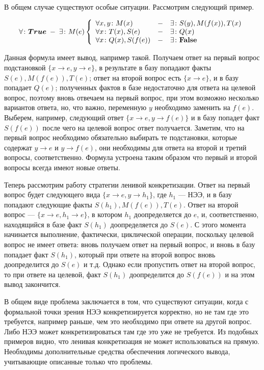 В общем случае существуют особые ситуации. Рассмотрим следующий пример.
\begin{example}[]\label{example:uhe1}
$$\forall\colon\boldsymbol{True} \; - \; \exists\colon M(e) \left\{
\begin{array}{lcl}
 \forall x,y\colon M(x) & - & \exists\colon S(y),M(f(x)),T(x) \\
 \forall x \colon T(x),S(e) & - & \exists\colon Q(x) \\
 \forall x \colon Q(x),S(f(e)) & - & \exists\colon\textbf{False}
\end{array}
\right.$$

Данная формула имеет вывод, например такой. Получаем ответ на первый вопрос подстановкой $\{ x\rightarrow e, y\rightarrow e \}$, в результате в базу попадают факты $S(e),M(f(e)),T(e)$; ответ на второй вопрос есть $\{ x \rightarrow e\}$, и в базу попадает $Q(e)$; полученных фактов в базе недостаточно для ответа на целевой вопрос, поэтому вновь отвечаем на первый вопрос, при этом возможно несколько вариантов ответа, но, что важно, переменную $y$ необходимо заменить на $f(e)$. Выберем, например, следующий ответ $\{x \rightarrow e, y \rightarrow f(e) \}$ и в базу попадет факт $S(f(e))$ после чего на целевой вопрос ответ получается. Заметим, что на первый вопрос необходимо обязательно выбирать те подстановки, которые содержат $y \rightarrow e$ и $y \rightarrow f(e)$, они необходимы для ответа на второй и третий вопросы, соответственно. Формула устроена таким образом что первый и второй вопросы всегда имеют новые ответы.

Теперь рассмотрим работу стратегии ленивой конкретизации. Ответ на первый вопрос будет следующего вида $\{ x\rightarrow e, y\rightarrow h_1 \}$, где $h_1$ --- НЭЭ, и в базу попадают следующие факты $S(h_1),M(f(e)),T(e)$. Ответ на второй вопрос --- $\{ x\rightarrow e, h_1\rightarrow e \}$, в котором $h_1$ доопределяется до $e$, и, соответственно, находящийся в базе факт $S(h_1)$ доопределяется до $S(e)$. С этого момента начинается выполнение, фактически, циклической операции, поскольку целевой вопрос не имеет ответа: вновь получаем ответ на первый вопрос, и вновь в базу попадает факт $S(h_1)$, который при ответе на второй вопрос вновь доопределится до $S(e)$ и т.д. Однако если пропустить ответ на второй вопрос, то при ответе на целевой, факт $S(h_1)$ доопределится до $S(f(e))$ и на этом вывод закончится.
\end{example}


В общем виде проблема заключается в том, что существуют ситуации, когда с формальной точки зрения НЭЭ конкретизируется корректно, но не там где это требуется, например раньше, чем это необходимо при ответе на другой вопрос. Либо НЭЭ может конкретизироваться там где это уже не требуется. Из подобных примеров видно, что ленивая конкретизация не может использоваться на прямую. Необходимы дополнительные  средства обеспечения логического вывода, учитывающие описанные только что проблемы.

